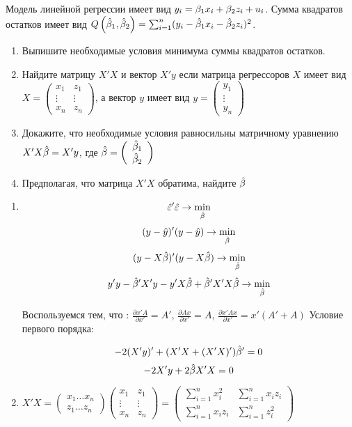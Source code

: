 \begin{problem}
Модель линейной регрессии имеет вид $y_i=\beta_1 x_{i}+\beta_2 z_{i} + u_i$.
Сумма квадратов остатков имеет вид $Q\left(\hat{\beta}_1,\hat{\beta}_2\right)=\sum_{i=1}^n (y_i - \hat{\beta}_1 x_{i}-\hat{\beta}_2 z_{i})^2$.
\begin{enumerate}
\item Выпишите необходимые условия минимума суммы квадратов остатков.
\item Найдите матрицу $X'X$ и вектор $X'y$ если матрица регрессоров $X$ имеет вид
$X=
\left(
\begin{array}{cc}
x_{1} & z_{1} \\
\vdots & \vdots \\
x_{n} & z_{n}
\end{array}
\right)
$,
а вектор $y$ имеет вид
$y=
\left(
\begin{array}{c}
y_1 \\
\vdots \\
y_n
\end{array}
\right)
$
\item Докажите, что необходимые условия равносильны матричному уравнению $X'X\hat{\beta}=X'y$, где
$\hat{\beta}=
\left(
\begin{array}{c}
\hat{\beta}_1 \\
\hat{\beta}_2
\end{array}
\right)
$
\item Предполагая, что матрица $X'X$ обратима, найдите $\hat{\beta}$
\end{enumerate}

\begin{sol}
\begin{enumerate}
\item
\[\hat{\varepsilon}'\hat{\varepsilon}\rightarrow \min_{\hat{\beta}}\]
\[(y-\hat{y})'(y-\hat{y})\rightarrow\min_{\hat{\beta}}\]
\[(y-X\hat{\beta})'(y-X\hat{\beta})\rightarrow\min_{\hat{\beta}}\]
\[y'y-\hat{\beta}' X'y-y'X\hat{\beta}+\hat{\beta}'X'X\hat{\beta}\rightarrow\min_{\hat{\beta}}\]

Воспользуемся тем, что : $\frac{\partial x'A}{\partial x'}=A'$, $\frac{\partial Ax}{\partial x'}=A$,
$\frac{\partial x'Ax}{\partial x'}=x'(A'+A)$
Условие первого порядка:

\[-2(X'y)'+(X'X+(X'X)')\hat{\beta}'=0\]
\[-2X'y+2\hat{\beta} X'X=0\]

\item
$X'X=\begin{pmatrix}
x_{1}\ldots x_{n}\\
z_{1}\ldots z_{n}
\end{pmatrix}
\begin{pmatrix}
x_{1}& z_{1}\\
\vdots&\vdots\\
x_{n}& z_{n}
\end{pmatrix}=
\begin{pmatrix}
\sum_{i=1}^n x^2_i   & \sum_{i=1}^n x_i z_i \\
\sum_{i=1}^n x_i z_i & \sum_{i=1}^n z^2_i
\end{pmatrix}$


\end{enumerate}
\end{sol}
\end{problem}

